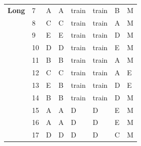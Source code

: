 \documentclass[pageno]{jpaper}
\begin{document}
\begin{table}[]
\begin{tabular}{llllllll}
\textbf{Long}            & 7               & A                       & A                      & train                   & train                   & B                       & M                   \\
\textbf{}                & 8               & C                       & C                      & train                   & train                   & A                       & M                   \\
\textbf{}                & 9               & E                       & E                      & train                   & train                   & D                       & M                   \\
\textbf{}                & 10              & D                       & D                      & train                   & train                   & E                       & M                   \\
\textbf{}                & 11              & B                       & B                      & train                   & train                   & A                       & M                   \\
\textbf{}                & 12              & C                       & C                      & train                   & train                   & A                       & E                   \\
\textbf{}                & 13              & E                       & B                      & train                   & train                   & D                       & E                   \\
\textbf{}                & 14              & B                       & B                      & train                   & train                   & D                       & M                   \\
\textbf{}                & 15              & A                       & A                      & D                       & D                       & E                       & M                   \\
\textbf{}                & 16              & A                       & A                      & D                       & D                       & E                       & M                   \\
\textbf{}                & 17              & D                       & D                      & D                       & D                       & C                       & M                   \\

\end{tabular}
\end{table}
\end{document}

